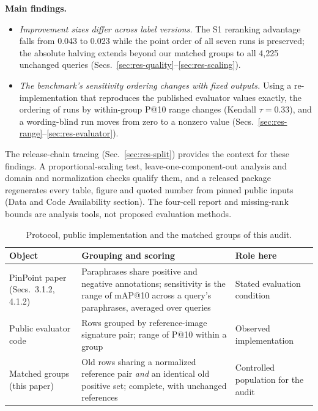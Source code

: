 \documentclass[conference]{IEEEtran}
\begin{document}
\textbf{Main findings.}
\begin{itemize}
\item \emph{Improvement sizes differ across label versions.} The S1 reranking advantage falls from 0.043 to 0.023 while the point order of all seven runs is preserved; the absolute halving extends beyond our matched groups to all 4,225 unchanged queries (Secs.~\ref{sec:res-quality}--\ref{sec:res-scaling}).
\item \emph{The benchmark's sensitivity ordering changes with fixed outputs.} Using a re-implementation that reproduces the published evaluator values exactly, the ordering of runs by within-group P@10 range changes (Kendall $\tau=0.33$), and a wording-blind run moves from zero to a nonzero value (Secs.~\ref{sec:res-range}--\ref{sec:res-evaluator}).
\end{itemize}
The release-chain tracing (Sec.~\ref{sec:res-split}) provides the context for these findings. A proportional-scaling test, leave-one-component-out analysis and domain and normalization checks qualify them, and a released package regenerates every table, figure and quoted number from pinned public inputs (Data and Code Availability section). The four-cell report and missing-rank bounds are analysis tools, not proposed evaluation methods.

\begin{table}[!t]
\centering
\caption{Protocol, public implementation and the matched groups of this audit.}
\label{tab:objects}
\footnotesize
\setlength{\tabcolsep}{3pt}
\begin{tabular}{@{}>{\raggedright\arraybackslash}p{}>{\raggedright\arraybackslash}p{}>{\raggedright\arraybackslash}p{}@{}}
\toprule
Object & Grouping and scoring & Role here\\
\midrule
PinPoint paper~\cite{pinpoint} (Secs.~3.1.2, 4.1.2) & Paraphrases share positive and negative annotations; sensitivity is the range of mAP@10 across a query's paraphrases, averaged over queries & Stated evaluation condition\\
Public evaluator code & Rows grouped by reference-image signature pair; range of P@10 within a group & Observed implementation\\
Matched groups (this paper) & Old rows sharing a normalized reference pair \emph{and} an identical old positive set; complete, with unchanged references & Controlled population for the audit\\
\bottomrule
\end{tabular}
\end{table}
\end{document}
